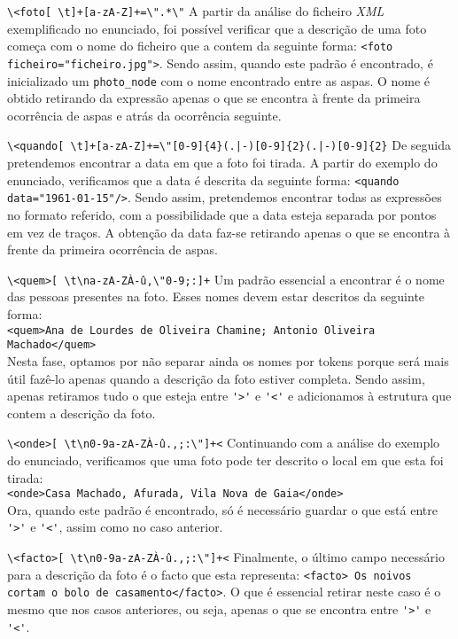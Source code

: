 \verb!\<foto[ \t]+[a-zA-Z]+=\".*\"!
A partir da análise do ficheiro \emph{XML} exemplificado no enunciado, foi possível verificar que a descrição de uma foto começa com o nome do ficheiro que a contem da seguinte forma: \verb!<foto ficheiro="ficheiro.jpg">!. Sendo assim, quando este padrão é encontrado, é inicializado um \verb!photo_node! com o nome encontrado entre as aspas. O nome é obtido retirando da expressão apenas o que se encontra à frente da primeira ocorrência de aspas e atrás da ocorrência seguinte.

\verb!\<quando[ \t]+[a-zA-Z]+=\"[0-9]{4}(.|-)[0-9]{2}(.|-)[0-9]{2}!
De seguida pretendemos encontrar a data em que a foto foi tirada. A partir do exemplo do enunciado, verificamos que a data é descrita da seguinte forma: \verb!<quando data="1961-01-15"/>!. Sendo assim, pretendemos encontrar todas as expressões no formato referido, com a possibilidade que a data esteja separada por pontos em vez de traços. A obtenção da data faz-se retirando apenas o que se encontra à frente da primeira ocorrência de aspas.

\verb!\<quem>[ \t\na-zA-ZÀ-û,\"0-9;:]+!
Um padrão essencial a encontrar é o nome das pessoas presentes na foto. Esses nomes devem estar descritos da seguinte forma: \\
\verb!<quem>Ana de Lourdes de Oliveira Chamine; Antonio Oliveira Machado</quem>!\\
Nesta fase, optamos por não separar ainda os nomes por tokens porque será mais útil fazê-lo apenas quando a descrição da foto estiver completa. Sendo assim, apenas retiramos tudo o que esteja entre \verb!'>'! e \verb!'<'! e adicionamos à estrutura que contem a descrição da foto.

\verb!\<onde>[ \t\n0-9a-zA-ZÀ-û.,;:\"]+<!
Continuando com a análise do exemplo do enunciado, verificamos que uma foto pode ter descrito o local em que esta foi tirada:\\
\verb!<onde>Casa Machado, Afurada, Vila Nova de Gaia</onde>!\\
Ora, quando este padrão é encontrado, só é necessário guardar o que está entre \verb!'>'! e \verb!'<'!, assim como no caso anterior.

\verb!\<facto>[ \t\n0-9a-zA-ZÀ-û.,;:\"]+<!
Finalmente, o último campo necessário para a descrição da foto é o facto que esta representa: \verb!<facto> Os noivos cortam o bolo de casamento</facto>!. O que é essencial retirar neste caso é o mesmo que nos casos anteriores, ou seja, apenas o que se encontra entre \verb!'>'! e \verb!'<'!.

